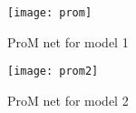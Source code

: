 \begin{figure}[H]
	\centering
	\texttt{[image: prom]}
	\caption{ProM net for model 1}
\end{figure}

\begin{figure}[H]
	\centering
	\texttt{[image: prom2]}
	\caption{ProM net for model 2}
\end{figure}

